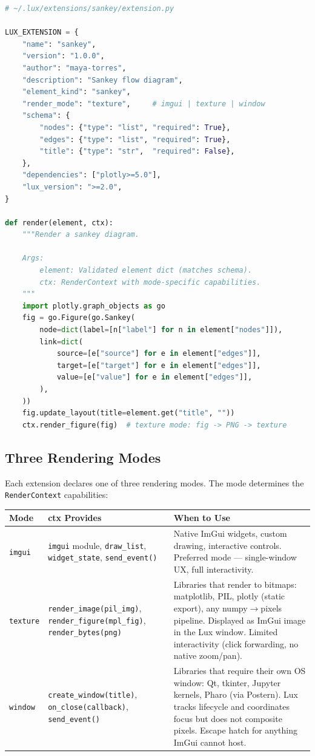\documentclass[a4paper,10pt]{article}
\newcommand{\ext}[1]{\texttt{#1}}
\begin{document}
\begin{lstlisting}[language=Python]
# ~/.lux/extensions/sankey/extension.py

LUX_EXTENSION = {
    "name": "sankey",
    "version": "1.0.0",
    "author": "maya-torres",
    "description": "Sankey flow diagram",
    "element_kind": "sankey",
    "render_mode": "texture",     # imgui | texture | window
    "schema": {
        "nodes": {"type": "list", "required": True},
        "edges": {"type": "list", "required": True},
        "title": {"type": "str",  "required": False},
    },
    "dependencies": ["plotly>=5.0"],
    "lux_version": ">=2.0",
}

def render(element, ctx):
    """Render a sankey diagram.

    Args:
        element: Validated element dict (matches schema).
        ctx: RenderContext with mode-specific capabilities.
    """
    import plotly.graph_objects as go
    fig = go.Figure(go.Sankey(
        node=dict(label=[n["label"] for n in element["nodes"]]),
        link=dict(
            source=[e["source"] for e in element["edges"]],
            target=[e["target"] for e in element["edges"]],
            value=[e["value"] for e in element["edges"]],
        ),
    ))
    fig.update_layout(title=element.get("title", ""))
    ctx.render_figure(fig)  # texture mode: fig -> PNG -> texture
\end{lstlisting}

\subsection{Three Rendering Modes}

Each extension declares one of three rendering modes.  The mode
determines the \texttt{RenderContext} capabilities:

\begin{center}
\begin{tabularx}{\linewidth}{@{}lp{3cm}>{\raggedright\arraybackslash}X@{}}
\toprule
\textbf{Mode} & \textbf{ctx Provides} & \textbf{When to Use} \\
\midrule
\ext{imgui} &
  \texttt{imgui} module,
  \texttt{draw\_list},
  \texttt{widget\_state},
  \texttt{send\_event()} &
  Native ImGui widgets, custom drawing, interactive controls.
  Preferred mode --- single-window UX, full interactivity. \\
\ext{texture} &
  \texttt{render\_image(pil\_img)},
  \texttt{render\_figure(mpl\_fig)},
  \texttt{render\_bytes(png)} &
  Libraries that render to bitmaps: matplotlib, PIL, plotly
  (static export), any numpy$\to$pixels pipeline.  Displayed
  as ImGui image in the Lux window.  Limited interactivity
  (click forwarding, no native zoom/pan). \\
\ext{window} &
  \texttt{create\_window(title)},
  \texttt{on\_close(callback)},
  \texttt{send\_event()} &
  Libraries that require their own OS window: Qt, tkinter,
  Jupyter kernels, Pharo (via Postern).  Lux tracks lifecycle
  and coordinates focus but does not composite pixels.
  Escape hatch for anything ImGui cannot host. \\
\bottomrule
\end{tabularx}
\end{center}
\end{document}
